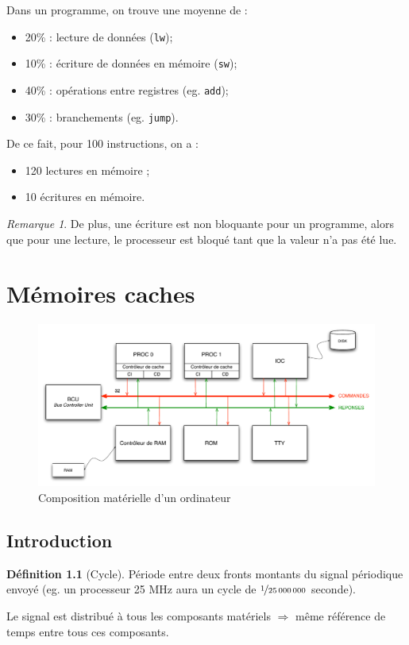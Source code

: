 \documentclass[11pt,english,french]{scrreprt}
\theoremstyle{remark}
\newtheorem*{rem*}{Remarque}
\theoremstyle{definition}
\newtheorem*{def*}{Définition}
\begin{document}
Dans un programme, on trouve une moyenne de :\begin{itemize}
	\item 20\% : lecture de données (\lstinline!lw!);
	\item 10\% : écriture de données en mémoire (\lstinline!sw!);
	\item 40\% : opérations entre registres (eg. \lstinline!add!);
	\item 30\% : branchements (eg. \lstinline!jump!).
\end{itemize}

De ce fait, pour 100 instructions, on a :\begin{itemize}
	\item 120 lectures en mémoire ;
	\item 10 écritures en mémoire.
\end{itemize}

\begin{rem*}
	De plus, une écriture est non bloquante pour un programme, alors que pour une lecture, le processeur est bloqué tant que la valeur n'a pas été lue.
\end{rem*}

\chapter{Mémoires caches} %

\begin{figure}[!h]
	\center
	\includegraphics[scale=.5]{diagrammes/bus3}
	\caption{Composition matérielle d'un ordinateur}
\end{figure}

\section{Introduction} %

\begin{def*}[Cycle]
	Période entre deux fronts montants du signal périodique envoyé (eg. un processeur 25 MHz aura un cycle de $\nicefrac{1}{25\,000\,000}$ seconde).
	
	Le signal est distribué à tous les composants matériels $\Rightarrow$ même référence de temps entre tous ces composants.
\end{def*}
\end{document}
